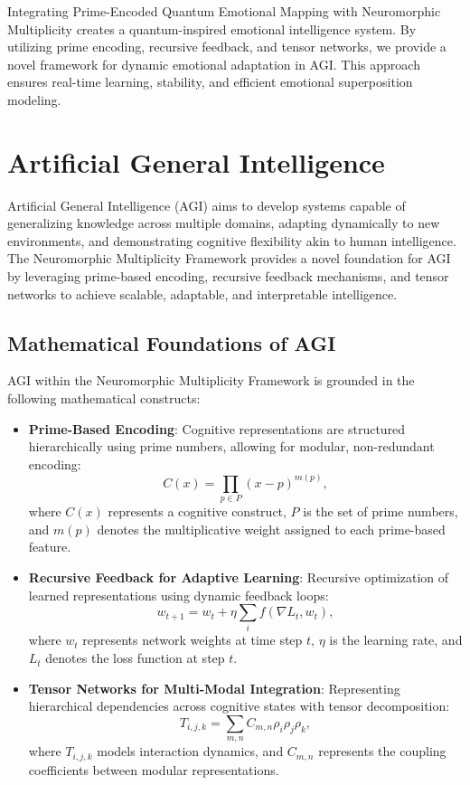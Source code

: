 \documentclass{article}
\theoremstyle{plain}
\begin{document}
Integrating Prime-Encoded Quantum Emotional Mapping with Neuromorphic Multiplicity creates a quantum-inspired emotional intelligence system. By utilizing prime encoding, recursive feedback, and tensor networks, we provide a novel framework for dynamic emotional adaptation in AGI. This approach ensures real-time learning, stability, and efficient emotional superposition modeling.

\section{Artificial General Intelligence}

Artificial General Intelligence (AGI) aims to develop systems capable of generalizing knowledge across multiple domains, adapting dynamically to new environments, and demonstrating cognitive flexibility akin to human intelligence. The Neuromorphic Multiplicity Framework provides a novel foundation for AGI by leveraging prime-based encoding, recursive feedback mechanisms, and tensor networks to achieve scalable, adaptable, and interpretable intelligence.

\subsection{Mathematical Foundations of AGI}
AGI within the Neuromorphic Multiplicity Framework is grounded in the following mathematical constructs:
\begin{itemize}
    \item \textbf{Prime-Based Encoding}: Cognitive representations are structured hierarchically using prime numbers, allowing for modular, non-redundant encoding:
    \begin{equation}
        C(x) = \prod_{p \in P} (x - p)^{m(p)},
    \end{equation}
    where $C(x)$ represents a cognitive construct, $P$ is the set of prime numbers, and $m(p)$ denotes the multiplicative weight assigned to each prime-based feature.

    \item \textbf{Recursive Feedback for Adaptive Learning}: Recursive optimization of learned representations using dynamic feedback loops:
    \begin{equation}
        w_{t+1} = w_t + \eta \sum_{i} f(\nabla L_t, w_t),
    \end{equation}
    where $w_t$ represents network weights at time step $t$, $\eta$ is the learning rate, and $L_t$ denotes the loss function at step $t$.
    
    \item \textbf{Tensor Networks for Multi-Modal Integration}: Representing hierarchical dependencies across cognitive states with tensor decomposition:
    \begin{equation}
        T_{i,j,k} = \sum_{m,n} C_{m,n} \rho_i \rho_j \rho_k,
    \end{equation}
    where $T_{i,j,k}$ models interaction dynamics, and $C_{m,n}$ represents the coupling coefficients between modular representations.
\end{itemize}
\end{document}

